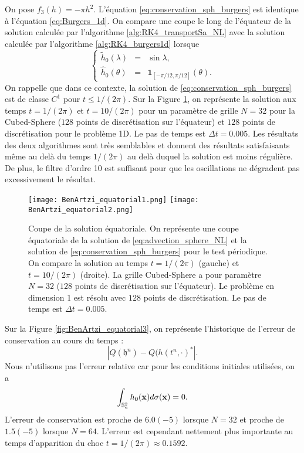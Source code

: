 On pose $f_3(h) = - \pi h^2$. L'équation \eqref{eq:conservation_sph_burgers} est identique à l'équation \eqref{eq:Burgers_1d}. On compare une coupe le long de l'équateur de la solution calculée par l'algorithme \ref{alg:RK4_transportSa_NL} avec la solution calculée par l'algorithme \ref{alg:RK4_burgers1d} lorsque
\begin{equation}
\left\lbrace
\begin{array}{rcl}
\tilde{h}_0(\lambda) & = & \sin \lambda, \\
\hat{h}_0(\theta) & = & \mathbf{1}_{[-\pi/12, \pi/12]}(\theta).
\end{array}
\right.
\end{equation}
On rappelle que dans ce contexte, la solution de \eqref{eq:conservation_sph_burgers} est de classe $C^1$ pour $t \leq 1/(2 \pi)$. Sur la Figure \ref{fig:BenArtzi_equatorial1}, on représente la solution aux temps $t=1/(2 \pi)$ et $t=10/(2\pi)$ pour un paramètre de grille $N=32$ pour la Cubed-Sphere ($128$ points de discrétisation sur l'équateur) et $128$ points de discrétisation pour le problème 1D. Le pas de temps est $\Delta t=0.005$. Les résultats des deux algorithmes sont très semblables et donnent des résultats satisfaisants même au delà du temps $1/(2 \pi)$ au delà duquel la solution est moins régulière. De plus, le filtre d'ordre 10 est suffisant pour que les oscillations ne dégradent pas excessivement le résultat.

\begin{figure}[htbp]
\begin{center}
\texttt{[image: BenArtzi\_equatorial1.png]}
\texttt{[image: BenArtzi\_equatorial2.png]}
\end{center}
\caption{Coupe de la solution équatoriale. On représente une coupe équatoriale de la solution de \eqref{eq:advection_sphere_NL} et la solution de \eqref{eq:conservation_sph_burgers} pour le test périodique. On compare la solution au temps $t=1/(2\pi)$ (gauche) et $t=10/(2\pi)$ (droite). La grille Cubed-Sphere a pour paramètre $N=32$ ($128$ points de discrétisation sur l'équateur). Le problème en dimension 1 est résolu avec $128$ points de discrétisation. Le pas de temps est $\Delta t = 0.005$.}
\label{fig:BenArtzi_equatorial1}
\end{figure} 

Sur la Figure \ref{fig:BenArtzi_equatorial3}, on représente l'historique de l'erreur de conservation au cours du temps :
\begin{equation}
|Q(\mathfrak{h}^n) - Q(h(t^n, \cdot)^*|.
\end{equation}
Nous n'utilisons pas l'erreur relative car pour les conditions initiales utilisées, on a
\begin{equation}
\displaystyle\int_{\mathbb{S}_a^2} h_0(\mathbf{x}) d \sigma(\mathbf{x}) = 0.
\end{equation}
L'erreur de conservation est proche de $6.0 (-5)$ lorsque $N=32$ et proche de $1.5 (-5)$ lorsque $N=64$. L'erreur est cependant nettement plus importante au temps d'apparition du choc $t=1/(2\pi) \approx 0.1592$. 

